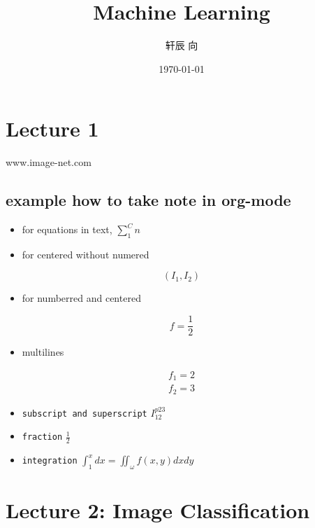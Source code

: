 \documentclass[11pt]{article}
\author{轩辰 向}
\date{\today}
\title{Machine Learning}
\begin{document}
\maketitle
\tableofcontents

\section{Lecture 1}
\label{sec:org79c8d85}
www.image-net.com

\subsection{example how to take note in org-mode}
\label{sec:orged1d3c7}

\begin{itemize}
\item for equations in text, \(\sum_{1}^C{n}\)

\item for centered without numered
\end{itemize}
\[ (I_1,I_2) \]

\begin{itemize}
\item for numberred and centered
\end{itemize}

\begin{equation}
f=\frac{1}{2}
\end{equation}

\begin{itemize}
\item multilines
\end{itemize}
\begin{equation}
\begin{aligned}
f_1 = 2\\
f_2 = 3
\end{aligned}
\end{equation}

\begin{itemize}
\item \texttt{subscript and superscript} \(I_{12} ^{p23}\)
\item \texttt{fraction} \(\frac{1}{2}\)
\item \texttt{integration} \(\int_{1}^{x} dx = \iint_\omega f(x,y)dxdy\)
\end{itemize}

\section{Lecture 2: Image Classification}
\label{sec:orgac2b34e}
\end{document}
